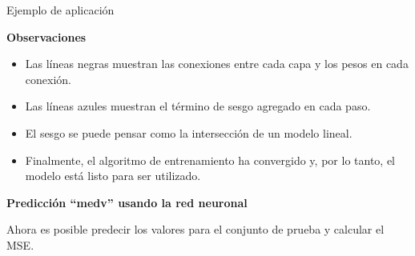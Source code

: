 \documentclass[
  ignorenonframetext,
]{beamer}
\newenvironment{Shaded}{\begin{snugshade}}{\end{snugshade}}
\newcommand{\DecValTok}[1]{\textcolor[rgb]{0.00,0.00,0.81}{#1}}
\newcommand{\KeywordTok}[1]{\textcolor[rgb]{0.13,0.29,0.53}{\textbf{#1}}}
\newcommand{\NormalTok}[1]{#1}
\newcommand{\OperatorTok}[1]{\textcolor[rgb]{0.81,0.36,0.00}{\textbf{#1}}}
\newcommand{\StringTok}[1]{\textcolor[rgb]{0.31,0.60,0.02}{#1}}
\begin{document}
\begin{frame}[fragile]{Ejemplo de aplicación}
\begin{block}{}

\begin{block}{\textbf{Observaciones}}

\begin{itemize}
\item
  Las líneas negras muestran las conexiones entre cada capa y los pesos
  en cada conexión.
\item
  Las líneas azules muestran el término de sesgo agregado en cada paso.
\item
  El sesgo se puede pensar como la intersección de un modelo lineal.
\item
  Finalmente, el algoritmo de entrenamiento ha convergido y, por lo
  tanto, el modelo está listo para ser utilizado.
\end{itemize}

\end{block}

\end{block}

\begin{block}{}

\begin{block}{\textbf{Predicción ``medv'' usando la red neuronal}}

Ahora es posible predecir los valores para el conjunto de prueba y
calcular el MSE.

\begin{Shaded}
\end{Shaded}


\end{block}
\end{block}
\end{frame}
\end{document}
